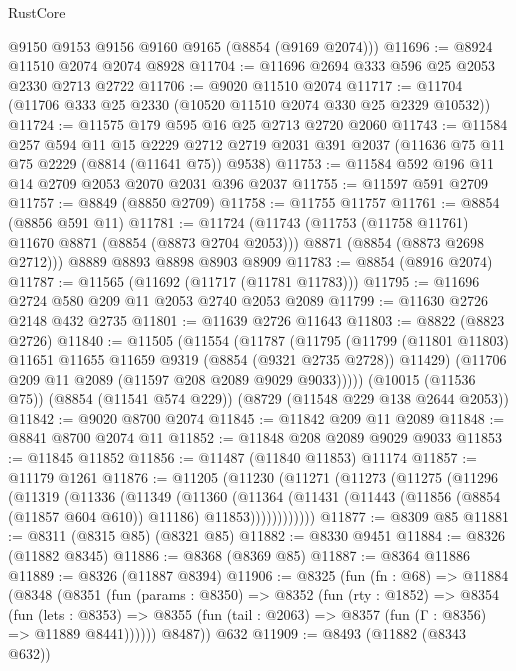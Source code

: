 \begin{lexlean}{RustCore}
\begin{coremodule}
      @9150
      @9153
      @9156
      @9160
      @9165
      (@8854 (@9169 @2074)))
@11696 := @8924 @11510 @2074 @2074 @8928
@11704 := @11696 @2694 @333 @596 @25 @2053 @2330 @2713 @2722
@11706 := @9020 @11510 @2074
@11717 := @11704 (@11706 @333 @25 @2330 (@10520 @11510 @2074 @330 @25 @2329 @10532))
@11724 := @11575 @179 @595 @16 @25 @2713 @2720 @2060
@11743 := @11584
    @257
    @594
    @11
    @15
    @2229
    @2712
    @2719
    @2031
    @391
    @2037
    (@11636 @75 @11 @75 @2229 (@8814 (@11641 @75)) @9538)
@11753 := @11584 @592 @196 @11 @14 @2709 @2053 @2070 @2031 @396 @2037
@11755 := @11597 @591 @2709
@11757 := @8849 (@8850 @2709)
@11758 := @11755 @11757
@11761 := @8854 (@8856 @591 @11)
@11781 := @11724
    (@11743
      (@11753 (@11758 @11761) @11670 @8871 (@8854 (@8873 @2704 @2053)))
      @8871
      (@8854 (@8873 @2698 @2712)))
    @8889
    @8893
    @8898
    @8903
    @8909
@11783 := @8854 (@8916 @2074)
@11787 := @11565 (@11692 (@11717 (@11781 @11783)))
@11795 := @11696 @2724 @580 @209 @11 @2053 @2740 @2053 @2089
@11799 := @11630 @2726 @2148 @432 @2735
@11801 := @11639 @2726 @11643
@11803 := @8822 (@8823 @2726)
@11840 := @11505
    (@11554
      (@11787
        (@11795
          (@11799 (@11801 @11803) @11651 @11655 @11659 @9319 (@8854 (@9321 @2735 @2728)) @11429)
          (@11706 @209 @11 @2089 (@11597 @208 @2089 @9029 @9033)))))
    (@10015 (@11536 @75))
    (@8854 (@11541 @574 @229))
    (@8729 (@11548 @229 @138 @2644 @2053))
@11842 := @9020 @8700 @2074
@11845 := @11842 @209 @11 @2089
@11848 := @8841 @8700 @2074 @11
@11852 := @11848 @208 @2089 @9029 @9033
@11853 := @11845 @11852
@11856 := @11487 (@11840 @11853) @11174
@11857 := @11179 @1261
@11876 := @11205
    (@11230
      (@11271
        (@11273
          (@11275
            (@11296
              (@11319
                (@11336
                  (@11349
                    (@11360
                      (@11364
                        (@11431
                          (@11443 (@11856 (@8854 (@11857 @604 @610)) @11186) @11853))))))))))))
@11877 := @8309 @85
@11881 := @8311 (@8315 @85) (@8321 @85)
@11882 := @8330 @9451
@11884 := @8326 (@11882 @8345)
@11886 := @8368 (@8369 @85)
@11887 := @8364 @11886
@11889 := @8326 (@11887 @8394)
@11906 := @8325
    (fun (fn : @68) =>
    @11884
      (@8348
        (@8351
          (fun (params : @8350) =>
          @8352
            (fun (rty : @1852) =>
            @8354
              (fun (lets : @8353) =>
              @8355 (fun (tail : @2063) => @8357 (fun (Γ : @8356) => @11889 @8441))))))
        @8487))
    @632
@11909 := @8493 (@11882 (@8343 @632))

\end{coremodule}
\end{lexlean}
